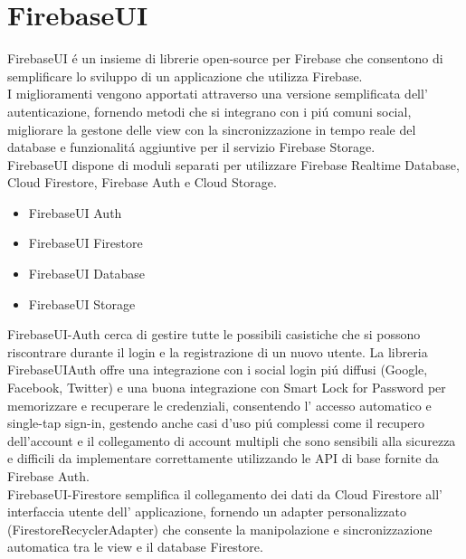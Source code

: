 \section{FirebaseUI}                 %
FirebaseUI \'e un insieme di librerie open-source per Firebase che consentono di semplificare lo sviluppo di un applicazione che utilizza Firebase.\\
I miglioramenti vengono apportati attraverso una versione semplificata dell' autenticazione, fornendo metodi che si integrano con i pi\'u comuni social, migliorare la gestone delle view con la sincronizzazione in tempo reale del database e funzionalit\'a aggiuntive per il servizio Firebase Storage.\\
FirebaseUI dispone di moduli separati per utilizzare Firebase Realtime Database, Cloud Firestore, Firebase Auth e Cloud Storage.
\begin{itemize}
  \item  FirebaseUI Auth
  \item  FirebaseUI Firestore
  \item  FirebaseUI Database
  \item  FirebaseUI Storage
\end{itemize}


FirebaseUI-Auth cerca di gestire tutte le possibili casistiche che si possono riscontrare durante il login e la registrazione di un nuovo utente.
La libreria FirebaseUIAuth offre una integrazione con i social login pi\'u diffusi (Google, Facebook, Twitter) e una buona integrazione con Smart Lock for Password per memorizzare e recuperare le credenziali, consentendo l' accesso automatico e single-tap sign-in, gestendo anche casi d'uso pi\'u complessi come il recupero dell'account e il collegamento di account multipli che sono sensibili alla sicurezza e difficili da implementare correttamente utilizzando le API di base fornite da Firebase Auth.\\
FirebaseUI-Firestore semplifica il collegamento dei dati da Cloud Firestore all' interfaccia utente dell' applicazione, fornendo un adapter personalizzato  (FirestoreRecyclerAdapter) che consente la manipolazione e sincronizzazione automatica tra le view e il database Firestore.

\clearpage{\pagestyle{empty}\cleardoublepage}
